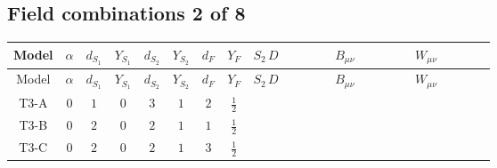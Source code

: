 \documentclass[8pt]{article}
\begin{document}
\begin{landscape}
\subsection*{Field combinations 2 of 8}
\begin{longtable}{@{}cccccccc >{\raggedright\arraybackslash}p{0.21\linewidth} >{\raggedright\arraybackslash}p{0.21\linewidth} >{\raggedright\arraybackslash}p{0.21\linewidth}@{}}
\toprule
Model & $\alpha$ & $d_{S_1}$ & $Y_{S_1}$ & $d_{S_2}$ & $Y_{S_2}$ & $d_F$ & $Y_F$ & $S_2\,D$ & $B_{\mu\nu}$ & $W_{\mu\nu}$ \\
\midrule
\endfirsthead
\toprule
Model & $\alpha$ & $d_{S_1}$ & $Y_{S_1}$ & $d_{S_2}$ & $Y_{S_2}$ & $d_F$ & $Y_F$ & $S_2\,D$ & $B_{\mu\nu}$ & $W_{\mu\nu}$ \\
\midrule
\endhead
T3-A & $0$ & $1$ & $0$ & $3$ & $1$ & $2$ & $\frac{1}{2}$ & \scriptsize\adjustbox{max width=\linewidth}{$\begin{gathered} +D_{\mu _1}\left(S_{2,j_1}\right){}^{\dagger } D_{\mu _1}\left(S_{2,j_1}\right)\end{gathered}$} & \scriptsize\adjustbox{max width=\linewidth}{$\begin{gathered} -\frac{\hbar  B_{\mu _1\mu _2}^2}{2 \epsilon }\end{gathered}$} & \scriptsize\adjustbox{max width=\linewidth}{$\begin{gathered} -\frac{\hbar  \left(W_{\mu _1\mu _2}^{A_1}\right){}^2}{2 \epsilon }\end{gathered}$} \\
\midrule
T3-B & $0$ & $2$ & $0$ & $2$ & $1$ & $1$ & $\frac{1}{2}$ & \scriptsize\adjustbox{max width=\linewidth}{$\begin{gathered} +D_{\mu _1}\left(S_{2,j_1}\right){}^{\dagger } D_{\mu _1}\left(S_{2,j_1}\right)\end{gathered}$} & \scriptsize\adjustbox{max width=\linewidth}{$\begin{gathered} -\frac{\hbar  B_{\mu _1\mu _2}^2}{4 \epsilon }\end{gathered}$} &  \\
\midrule
T3-C & $0$ & $2$ & $0$ & $2$ & $1$ & $3$ & $\frac{1}{2}$ & \scriptsize\adjustbox{max width=\linewidth}{$\begin{gathered} +D_{\mu _1}\left(S_{2,j_1}\right){}^{\dagger } D_{\mu _1}\left(S_{2,j_1}\right)\end{gathered}$} & \scriptsize\adjustbox{max width=\linewidth}{$\begin{gathered} -\frac{3 \hbar  B_{\mu _1\mu _2}^2}{4 \epsilon }\end{gathered}$} & \scriptsize\adjustbox{max width=\linewidth}{$\begin{gathered} -\frac{2 \hbar  \left(W_{\mu _1\mu _2}^{A_1}\right){}^2}{\epsilon }\end{gathered}$} \\

\end{longtable}
\end{landscape}
\end{document}
